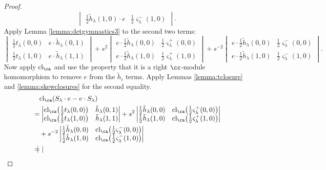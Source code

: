 \begin{proof}
\[\begin{vmatrix}
\frac{1}{2}\tilde{h}_\lambda(1,0) \cdot e & \frac{1}{2} \varsigma_\lambda^-(1,0)
\end{vmatrix}.
\]
Apply Lemma \ref{lemma:detgymnastics3} to the second two terms:
\[
\begin{vmatrix}
\frac{1}{2} t_\lambda(0,0) & e \cdot \tilde{h}_\lambda(0,1) \\
\frac{1}{2} t_\lambda(1,0) & e \cdot \tilde{h}_\lambda(1,1)
\end{vmatrix}
+ s^2
\begin{vmatrix}
e \cdot \frac{1}{2}\tilde{h}_\lambda(0,0) & \frac{1}{2} \varsigma_\lambda^+(0,0) \\
e \cdot \frac{1}{2}\tilde{h}_\lambda(1,0) & \frac{1}{2} \varsigma_\lambda^+(1,0)
\end{vmatrix}
+ s^{-2}
\begin{vmatrix}
e \cdot \frac{1}{2}\tilde{h}_\lambda(0,0) & \frac{1}{2} \varsigma_\lambda^-(0,0) \\
e \cdot \frac{1}{2}\tilde{h}_\lambda(1,0) & \frac{1}{2} \varsigma_\lambda^-(1,0)
\end{vmatrix}.
\]
Now apply $\cl_\ca$ and use the property that it is a right $\cc$-module homomorphism to remove $e$ from the $\tilde{h}_i$ terms. Apply Lemmas \ref{lemma:tclosure} and \ref{lemma:skewclosures} for the second equality.
\begin{align*}
&\quad \textrm{cl}_\ca ( S_\lambda \cdot e - e \cdot S_\lambda ) \\
&=
\begin{vmatrix}
\cl_\ca \big( \frac{1}{2} t_\lambda(0,0) \big) & \tilde{h}_\lambda(0,1) \\
\cl_\ca \big( \frac{1}{2} t_\lambda(1,0) \big) & \tilde{h}_\lambda(1,1)
\end{vmatrix}
+ s^2
\begin{vmatrix}
\frac{1}{2}\tilde{h}_\lambda(0,0) & \cl_\ca \big( \frac{1}{2} \varsigma_\lambda^+(0,0) \big) \\
\frac{1}{2}\tilde{h}_\lambda(1,0) & \cl_\ca \big( \frac{1}{2} \varsigma_\lambda^+(1,0) \big)
\end{vmatrix} \\
& \quad + s^{-2}
\begin{vmatrix}
\frac{1}{2}\tilde{h}_\lambda(0,0) & \cl_\ca \big( \frac{1}{2} \varsigma_\lambda^-(0,0) \big) \\
\frac{1}{2}\tilde{h}_\lambda(1,0) & \cl_\ca \big( \frac{1}{2} \varsigma_\lambda^-(1,0) \big)
\end{vmatrix} \\
&=
\begin{vmatrix}

\end{vmatrix}
\end{align*}
\end{proof}
